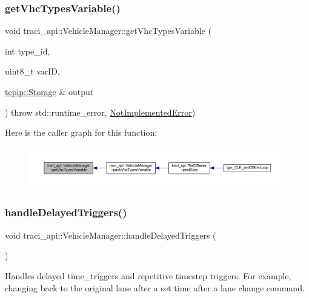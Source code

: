 \subsubsection{\texorpdfstring{get\+Vhc\+Types\+Variable()}{getVhcTypesVariable()}}
{\footnotesize\ttfamily void traci\+\_\+api\+::\+Vehicle\+Manager\+::get\+Vhc\+Types\+Variable (\begin{DoxyParamCaption}\item[{int}]{type\+\_\+id,  }\item[{uint8\+\_\+t}]{var\+ID,  }\item[{\hyperlink{classtcpip_1_1_storage}{tcpip\+::\+Storage} \&}]{output }\end{DoxyParamCaption}) throw  std\+::runtime\+\_\+error, \hyperlink{classtraci__api_1_1_not_implemented_error}{Not\+Implemented\+Error}) }

Here is the caller graph for this function\+:\nopagebreak
\begin{figure}[H]
\begin{center}
\leavevmode
\includegraphics[width=350pt]{classtraci__api_1_1_vehicle_manager_af404c1fa8e1459cbf415d1f4931c3ad6_icgraph}
\end{center}
\end{figure}
\mbox{\label{classtraci__api_1_1_vehicle_manager_a4e656c9c9b434113e01331cf0b84babc}} 
\subsubsection{\texorpdfstring{handle\+Delayed\+Triggers()}{handleDelayedTriggers()}}
{\footnotesize\ttfamily void traci\+\_\+api\+::\+Vehicle\+Manager\+::handle\+Delayed\+Triggers (\begin{DoxyParamCaption}{ }\end{DoxyParamCaption})}



Handles delayed time\+\_\+triggers and repetitive timestep triggers. For example, changing back to the original lane after a set time after a lane change command. 

